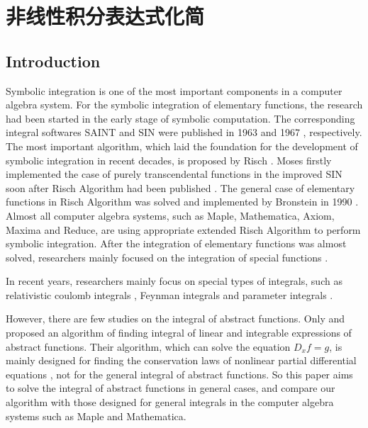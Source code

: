 \chapter{非线性积分表达式化简}
\section{Introduction}\label{Introduction-03}

Symbolic integration is one of the most important components in a computer algebra system. For the symbolic integration of elementary functions, the research had been started in the early stage of symbolic computation. The corresponding integral softwares SAINT  and SIN  were published in 1963 \citep{slagle1963} and 1967 \citep{moses1967}, respectively. The most important algorithm, which laid the foundation for the development of symbolic integration in recent decades, is proposed by Risch \citep{risch1969,risch1970}. Moses firstly implemented the case of purely transcendental functions in the improved SIN soon after Risch Algorithm had been published \citep{moses1971}. The general case of elementary functions in Risch Algorithm was solved and implemented by Bronstein in 1990 \citep{bronstein1990}. Almost all computer algebra systems, such as Maple, Mathematica, Axiom, Maxima and Reduce, are using appropriate extended Risch Algorithm to perform symbolic integration. After the integration of elementary functions was almost solved, researchers mainly focused on the integration of special functions \citep{cherry1985,cherry1986,bertrand1994,jeffrey1997}.

In recent years, researchers mainly focus on special types of integrals, such as relativistic coulomb integrals \citep{paule2012,paule2013}, Feynman integrals \citep{blumlein2012,smirnov2015} and parameter integrals \citep{raab2016}.


However, there are few studies on the integral of abstract functions. Only \cite{deconinck2009} and \cite{poole2010} proposed an algorithm of finding integral of linear and integrable expressions of abstract functions. Their algorithm, which can solve the equation $D_x f=g$, is mainly designed for finding the conservation laws of nonlinear partial differential equations \citep{poole2011}, not for the general integral of abstract functions. So this paper aims to solve the integral of abstract functions in general cases, and compare our algorithm with those designed for general integrals in the computer algebra systems such as Maple and Mathematica.

